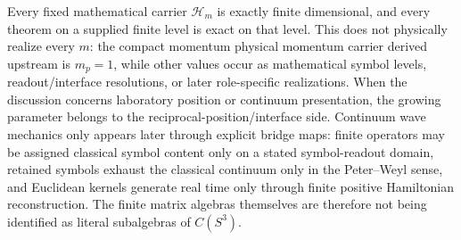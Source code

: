 \documentclass[12pt,a4paper]{article}
\begin{document}
\begin{remark}
\label{p4:rem:finite-scope}
Every fixed mathematical carrier \(\mathcal H_m\) is exactly finite
dimensional, and every theorem on a supplied finite level is exact on that
level.  This does not physically realize every \(m\): the compact momentum
physical momentum carrier derived upstream is \(m_p=1\), while other values occur as
mathematical symbol levels, readout/interface resolutions, or later
role-specific realizations.  When the discussion concerns laboratory
position or continuum presentation, the growing parameter belongs to the
reciprocal-position/interface side.
Continuum wave mechanics only appears later through explicit bridge maps: finite operators may be assigned classical symbol content only on a stated symbol-readout domain, retained symbols exhaust the classical continuum only in the Peter--Weyl sense, and Euclidean kernels generate real time only through finite positive Hamiltonian reconstruction.
The finite matrix algebras themselves are therefore not being identified as literal subalgebras of \(C(S^3)\).
\end{remark}
\end{document}
